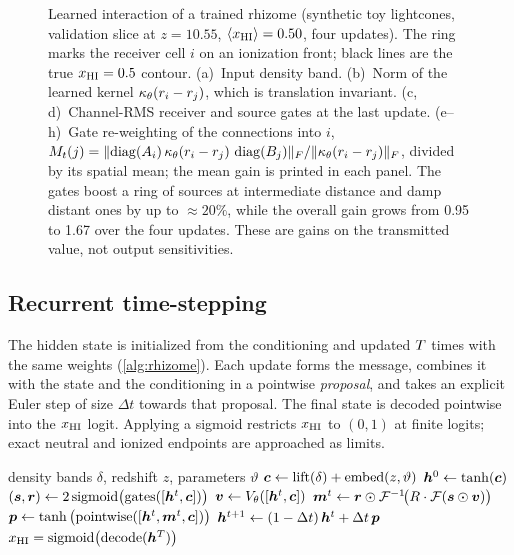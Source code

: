 \begin{figure}[!tp]
  \centering
  \caption{Learned interaction of a trained rhizome (synthetic toy lightcones, validation slice at $z=10.55$, $\langle x_{\mathrm{HI}}\rangle=0.50$, four updates). The ring marks the receiver cell $i$ on an ionization front; black lines are the true $x_{\mathrm{HI}}=0.5$ contour. (a)~Input density band. (b)~Norm of the learned kernel $\kappa_\theta(r_i-r_j)$, which is translation invariant. (c,\,d)~Channel-RMS receiver and source gates at the last update. (e--h)~Gate re-weighting of the connections into $i$, $M_t(j)=\lVert\operatorname{diag}(A_i)\,\kappa_\theta(r_i-r_j)\,\operatorname{diag}(B_j)\rVert_F/\lVert\kappa_\theta(r_i-r_j)\rVert_F$, divided by its spatial mean; the mean gain is printed in each panel. The gates boost a ring of sources at intermediate distance and damp distant ones by up to ${\approx}20\%$, while the overall gain grows from 0.95 to 1.67 over the four updates. These are gains on the transmitted value, not output sensitivities.}
  \label{fig:mechanism}
\end{figure}

\subsection{Recurrent time-stepping}
\label{sec:rhizome-recurrence}

The hidden state is initialized from the conditioning and updated $T$ times with the same weights (\cref{alg:rhizome}). Each update forms the message, combines it with the state and the conditioning in a pointwise \emph{proposal}, and takes an explicit Euler step of size $\Delta t$ towards that proposal. The final state is decoded pointwise into the $x_{\mathrm{HI}}$ logit. Applying a sigmoid restricts $x_{\mathrm{HI}}$ to $(0,1)$ at finite logits; exact neutral and ionized endpoints are approached as limits.

\begin{algorithm}[!htb]
  \caption{Rhizome operator forward pass}
  \label{alg:rhizome}
  \begin{algorithmic}[1]
    \Require density bands $\delta$, redshift $z$, parameters $\vartheta$
    \State $\bm{c} \gets \mathrm{lift}(\delta) + \mathrm{embed}(z,\vartheta)$
    \State $\bm{h}^0 \gets \tanh(\bm{c})$
     
      \State $(\bm{s},\bm{r}) \gets 2\,\mathrm{sigmoid}\big(\mathrm{gates}([\bm{h}^t,\bm{c}])\big)$ 
      \State $\bm{v} \gets V_\theta([\bm{h}^t,\bm{c}])$
      \State $\bm{m}^t \gets \bm{r}\odot \mathcal{F}^{-1}\!\big(R\cdot\mathcal{F}(\bm{s}\odot\bm{v})\big)$
      \State $\bm{p} \gets \tanh\big(\mathrm{pointwise}([\bm{h}^t,\bm{m}^t,\bm{c}])\big)$
      \State $\bm{h}^{t+1} \gets (1-\Delta t)\,\bm{h}^t + \Delta t\,\bm{p}$
    \EndFor
    \State \Return $x_{\mathrm{HI}} = \mathrm{sigmoid}\big(\mathrm{decode}(\bm{h}^{T})\big)$
  \end{algorithmic}
\end{algorithm}

